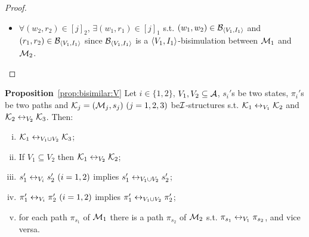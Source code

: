 \documentclass[twoside,11pt]{article}
\begin{document}
\begin{proof}
\begin{itemize}
			\item $\forall (w_2, r_2)\in [j]_2$, $\exists(w_1, r_1)\in [j]_1$ s.t. $(w_1, w_2) \in {\cal B}_{\langle{V_1, I_1}\rangle}$ and $(r_1, r_2) \in {\cal B}_{\langle{V_1, I_1}\rangle}$ since ${\cal B}_{\langle{V_1, I_1}\rangle}$ is a ${\langle{V_1, I_1}\rangle}$-bisimulation between ${\cal M}_1$ and ${\cal M}_2$.
		\end{itemize}
	\end{proof}
	
	\noindent\textbf{Proposition}~\ref{prop:bisimilar:V} 	Let $i\in \{1,2\}$, $V_1,V_2\subseteq\cal A$, $s_i'$s be two states,
	$\pi_i'$s be two paths
	and ${\cal K}_j=({\cal M}_j,s_j)~(j=1,2,3)$ be${\cal I}$-structures
	s.t.
	${\cal K}_1\leftrightarrow_{V_1}{\cal K}_2$ and ${\cal K}_2\leftrightarrow_{V_2}{\cal K}_3$.
	Then:
	\begin{enumerate}[(i)]
		\item ${\cal K}_1\leftrightarrow_{V_1\cup V_2}{\cal K}_3$;
		\item If $V_1 \subseteq V_2$ then ${\cal K}_1 \leftrightarrow_{V_2} {\cal K}_2$;
		\item $s_1'\leftrightarrow_{V_i}s_2'~(i=1,2)$ implies $s_1'\leftrightarrow_{V_1\cup V_2}s_2'$;
		\item $\pi_1'\leftrightarrow_{V_i}\pi_2'~(i=1,2)$ implies $\pi_1'\leftrightarrow_{V_1\cup V_2}\pi_2'$;
		\item for each path $\pi_{s_1}$ of ${\cal M}_1$ there is a path $\pi_{s_2}$  of ${\cal M}_2$ s.t. $\pi_{s_1} \leftrightarrow_{V_1} \pi_{s_2}$, and vice versa.
	\end{enumerate}
	
\end{document}
